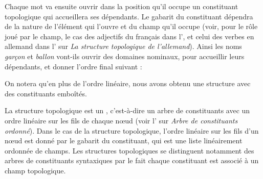 Chaque mot va ensuite ouvrir dans la position qu’il occupe un constituant topologique qui accueillera ses dépendants. Le gabarit du constituant dépendra de la nature de l’élément qui l’ouvre et du champ qu’il occupe (voir, pour le rôle joué par le champ, le cas des adjectifs du français dans l’, et celui des verbes en allemand dans l’ sur \textit{La structure topologique de l’allemand}). Ainsi les noms \textit{garçon} et \textit{ballon} vont-ils ouvrir des domaines nominaux, pour accueillir leurs dépendants, et donner l’ordre final suivant :

\ea\label{ex:topo-ballon}%
\z

On notera qu’en plus de l’ordre linéaire, nous avons obtenu une structure avec des constituants emboîtés.


La structure topologique est un , c’est-à-dire un arbre de constituants  avec un ordre linéaire sur les fils de chaque nœud (voir l’ sur \textit{Arbre de constituants ordonné}). Dans le cas de la structure topologique, l’ordre linéaire sur les fils d’un nœud est donné par le gabarit du constituant, qui est une liste linéairement ordonnée de champs. Les structures topologiques se distinguent notamment des arbres de constituants syntaxiques par le fait chaque constituant est associé à un champ topologique.

